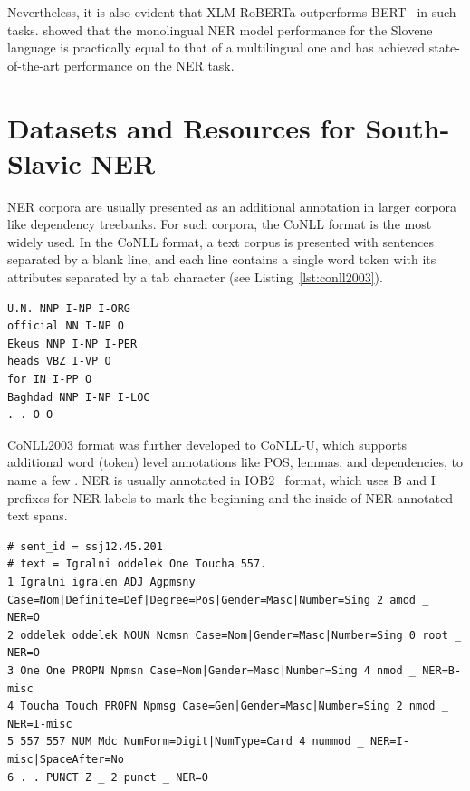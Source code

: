 Nevertheless, it is also evident that XLM-RoBERTa outperforms BERT~\parencite{suppa2021benchmarking} in such tasks. 
\textcite{prelevikj-zitnik-2021-multilingual} showed that the monolingual NER model performance for the Slovene language is practically equal to that of a multilingual one and has achieved state-of-the-art performance on the NER task.

\section{Datasets and Resources for South-Slavic NER}
NER corpora are usually presented as an additional annotation in larger corpora like dependency treebanks. 
For such corpora, the CoNLL format is the most widely used.
In the CoNLL format, a text corpus is presented with sentences separated by a blank line, and each line contains a single word token with its attributes separated by a tab character (see Listing~\ref{lst:conll2003}).

\begin{lstlisting}[basicstyle=\tiny,caption=Example original CoNLL-2003 format,label=lst:conll2003]
U.N. NNP I-NP I-ORG
official NN I-NP O
Ekeus NNP I-NP I-PER
heads VBZ I-VP O
for IN I-PP O
Baghdad NNP I-NP I-LOC
. . O O
\end{lstlisting}

CoNLL2003 format was further developed to CoNLL-U, which supports additional word (token) level annotations like POS, lemmas, and dependencies, to name a few \parencite{marneffe2021universal}.
NER is usually annotated in IOB2~\parencite{IOB2} format, which uses B and I prefixes for NER labels to mark the beginning and the inside of NER annotated text spans.

\begin{lstlisting}[inputencoding=utf8,extendedchars=true,basicstyle=\tiny,caption=Example CoNLL-U format,label=lst:conllu]
# sent_id = ssj12.45.201
# text = Igralni oddelek One Toucha 557.
1 Igralni igralen ADJ Agpmsny Case=Nom|Definite=Def|Degree=Pos|Gender=Masc|Number=Sing 2 amod _ NER=O
2 oddelek oddelek NOUN Ncmsn Case=Nom|Gender=Masc|Number=Sing 0 root _ NER=O
3 One One PROPN Npmsn Case=Nom|Gender=Masc|Number=Sing 4 nmod _ NER=B-misc
4 Toucha Touch PROPN Npmsg Case=Gen|Gender=Masc|Number=Sing 2 nmod _ NER=I-misc
5 557 557 NUM Mdc NumForm=Digit|NumType=Card 4 nummod _ NER=I-misc|SpaceAfter=No
6 . . PUNCT Z _ 2 punct _ NER=O
\end{lstlisting}

